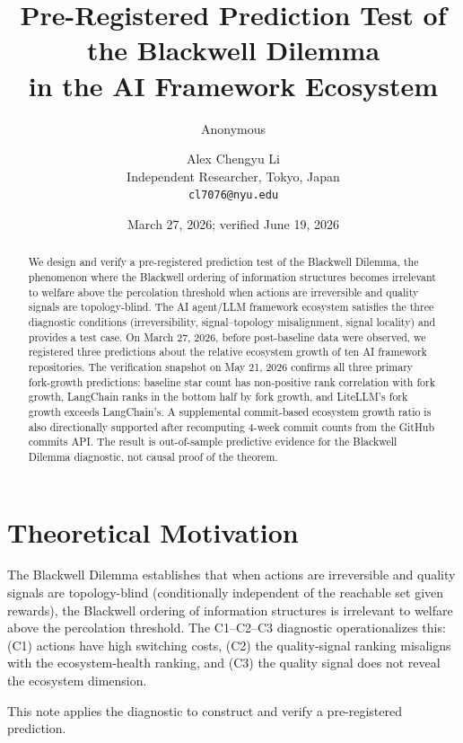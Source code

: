 \documentclass[12pt]{article}
\title{Pre-Registered Prediction Test of the Blackwell Dilemma\\
in the AI Framework Ecosystem}
\author{Anonymous}
\date{}
\author{Alex Chengyu Li\\[4pt]
  \small Independent Researcher, Tokyo, Japan\\
  \small \texttt{cl7076@nyu.edu}}
\date{March 27, 2026; verified June 19, 2026}
\begin{document}
\maketitle

\begin{abstract}
We design and verify a pre-registered prediction test of the Blackwell Dilemma, the phenomenon where the Blackwell ordering of information structures becomes irrelevant to welfare above the percolation threshold when actions are irreversible and quality signals are topology-blind. The AI agent/LLM framework ecosystem satisfies the three diagnostic conditions (irreversibility, signal--topology misalignment, signal locality) and provides a test case. On March 27, 2026, before post-baseline data were observed, we registered three predictions about the relative ecosystem growth of ten AI framework repositories. The verification snapshot on May 21, 2026 confirms all three primary fork-growth predictions: baseline star count has non-positive rank correlation with fork growth, LangChain ranks in the bottom half by fork growth, and LiteLLM's fork growth exceeds LangChain's. A supplemental commit-based ecosystem growth ratio is also directionally supported after recomputing 4-week commit counts from the GitHub commits API. The result is out-of-sample predictive evidence for the Blackwell Dilemma diagnostic, not causal proof of the theorem.
\end{abstract}

\section{Theoretical Motivation}

The Blackwell Dilemma establishes that when actions are irreversible and quality signals are topology-blind (conditionally independent of the reachable set given rewards), the Blackwell ordering of information structures is irrelevant to welfare above the percolation threshold. The C1--C2--C3 diagnostic operationalizes this: (C1) actions have high switching costs, (C2) the quality-signal ranking misaligns with the ecosystem-health ranking, and (C3) the quality signal does not reveal the ecosystem dimension.

This note applies the diagnostic to construct and verify a pre-registered prediction.

\end{document}
